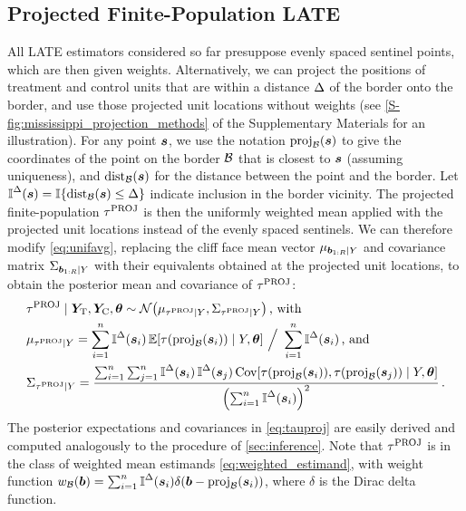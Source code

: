 \documentclass[12pt]{article}
\begin{document}
\subsection{Projected Finite-Population LATE}
All LATE estimators considered so far presuppose evenly spaced sentinel points, which are then given weights.
Alternatively, we can project the positions of treatment and control units that are within a distance \(\Delta\) of the border onto the border, and use those projected unit locations without weights (see \autoref*{S-fig:mississippi_projection_methods} of the Supplementary Materials for an illustration).
For any point \(\bm{s}\), we use the notation \(\proj_{\border}\del{\svec}\) to give the coordinates of the point on the border \(\mathcal{B}\) that is closest to \(\bm{s}\) (assuming uniqueness), and \(\dist_{\border}\del{\svec}\) for the distance between the point and the border.
Let \(\vicinity{\svec} = \allowbreak \Ind\cbr{\dist_{\border}\del{\svec} \le \buffer} \) indicate inclusion in the border vicinity.
The projected finite-population \(\tau^{\mathrm{PROJ}}\) is then the uniformly weighted mean applied with the projected unit locations instead of the evenly spaced sentinels.
We can therefore modify \autoref{eq:unifavg}, replacing the cliff face mean vector \(\mu_{\bm{b}_{1:R} \mid Y}\)
and covariance matrix \(\Sigma_{\bm{b}_{1:R} \mid Y}\)
with their equivalents obtained at the projected unit locations,
to obtain the posterior mean and covariance of \(\tau^{\mathrm{PROJ}}\):
\begin{equation}\begin{split}
    &\tauproj \mid \yt{}, \yc{}, \hyperparam \sim \normal\del{\mu_{\tauproj \mid Y}, \Sigma_{\tauproj \mid Y}}\,\text{, with} \\
    &\mu_{\tauproj \mid Y} = 
    \sum_{i=1}^{n}
    \vicinity{\svec_i}
    \E\sbr{
        \tau\del{
            \proj_{\border}\del{\svec_i}
        }
        \mid Y, \hyperparam
    } 
    \ 
    \Big/
    \ 
        \sum_{i=1}^{n}
        \vicinity{\svec_i}
    \,\text{, and}\\
    &\Sigma_{\tauproj \mid Y} = 
    \frac{
        \sum_{i=1}^{n} 
        \sum_{j=1}^{n} 
        \vicinity{\svec_i}
        \vicinity{\svec_j}
        \cov\sbr{
            \tau\del{
                \proj_{\border}\del{\svec_i}
            },
            \tau\del{
                \proj_{\border}\del{\svec_j}
            }
            \mid Y, \hyperparam
        }
    }{
        \del{
            \sum_{i=1}^{n}
            \vicinity{\svec_i}
        }^2
    }
    \,.
\end{split}
\label{eq:tauproj}
\end{equation}
The posterior expectations and covariances in \autoref{eq:tauproj} are easily derived and computed analogously to the procedure of \autoref{sec:inference}.
Note that \(\tau^{\mathrm{PROJ}}\) is in the class of weighted mean estimands \autoref{eq:weighted_estimand},
with weight function \(\weightb(\sentinel) = \sum_{i=1}^{n} \vicinity{\svec_i} \delta\del{ \sentinel - \proj_\border(\svec_i)}\), where \(\delta\) is the Dirac delta function.
\end{document}

